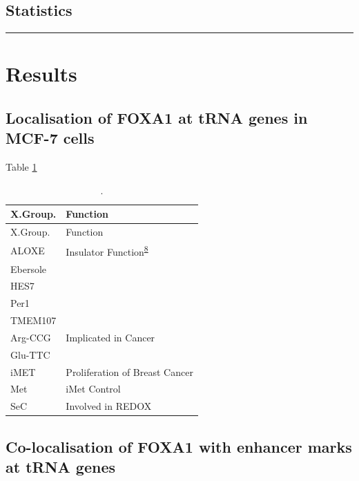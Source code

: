 \documentclass[
  11pt,
]{article}
\begin{document}
\hypertarget{statistics}{%
\subsection{Statistics}\label{statistics}}

\begin{center}\rule{0.5\linewidth}{0.5pt}\end{center}

\hypertarget{results}{%
\section{Results}\label{results}}

\hypertarget{localisation-of-foxa1-at-trna-genes-in-mcf-7-cells}{%
\subsection{Localisation of FOXA1 at tRNA genes in MCF-7 cells}\label{localisation-of-foxa1-at-trna-genes-in-mcf-7-cells}}

Table \ref{tab:clusters}

\begin{longtable}[]{@{}ll@{}}
\caption{\label{tab:clusters}.}\tabularnewline
\toprule()
X.Group. & Function \\
\midrule()
\endfirsthead
\toprule()
X.Group. & Function \\
\midrule()
\endhead
ALOXE & Insulator Function\textsuperscript{\protect\hyperlink{ref-raab2011}{8}} \\
Ebersole & \\
HES7 & \\
Per1 & \\
TMEM107 & \\
Arg-CCG & Implicated in Cancer \\
Glu-TTC & \\
iMET & Proliferation of Breast Cancer \\
Met & iMet Control \\
SeC & Involved in REDOX \\
\bottomrule()
\end{longtable}

\hypertarget{co-localisation-of-foxa1-with-enhancer-marks-at-trna-genes}{%
\subsection{Co-localisation of FOXA1 with enhancer marks at tRNA genes}\label{co-localisation-of-foxa1-with-enhancer-marks-at-trna-genes}}
\end{document}
